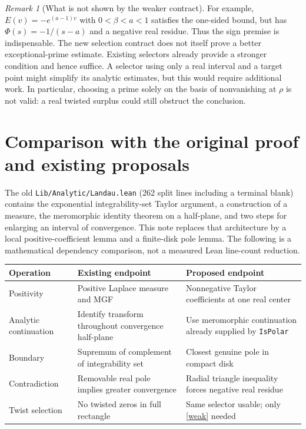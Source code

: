 \documentclass[11pt]{article}
\theoremstyle{remark}\newtheorem{remark}[theorem]{Remark}
\begin{document}
\begin{remark}[What is not shown by the weaker contract]
For example, $E(v)=-e^{(a-1)v}$ with $0<\beta<a<1$ satisfies the one-sided bound, but has $\Phi(s)=-1/(s-a)$ and a negative real residue. Thus the sign premise is indispensable. The new selection contract does not itself prove a better exceptional-prime estimate. Existing selectors already provide a stronger condition and hence suffice. A selector using only a real interval and a target point might simplify its analytic estimates, but this would require additional work. In particular, choosing a prime solely on the basis of nonvanishing at $\rho$ is not valid: a real twisted surplus could still obstruct the conclusion.
\end{remark}

\section{Comparison with the original proof and existing proposals}
The old \texttt{Lib/Analytic/Landau.lean} (262 split lines including a terminal blank) contains the exponential integrability-set Taylor argument, a construction of a measure, the meromorphic identity theorem on a half-plane, and two steps for enlarging an interval of convergence. This note replaces that architecture by a local positive-coefficient lemma and a finite-disk pole lemma. The following is a mathematical dependency comparison, not a measured Lean line-count reduction.
\begin{center}\small
\begin{tabularx}{\linewidth}{@{}p{.30\linewidth}XX@{}}\toprule
Operation & Existing endpoint & Proposed endpoint\\\midrule
Positivity & Positive Laplace measure and MGF & Nonnegative Taylor coefficients at one real center\\
Analytic continuation & Identify transform throughout convergence half-plane & Use meromorphic continuation already supplied by \texttt{IsPolar}\\
Boundary & Supremum of complement of integrability set & Closest genuine pole in compact disk\\
Contradiction & Removable real pole implies greater convergence & Radial triangle inequality forces negative real residue\\
Twist selection & No twisted zeros in full rectangle & Same selector usable; only \eqref{weak} needed\\\bottomrule
\end{tabularx}
\end{center}
\end{document}
